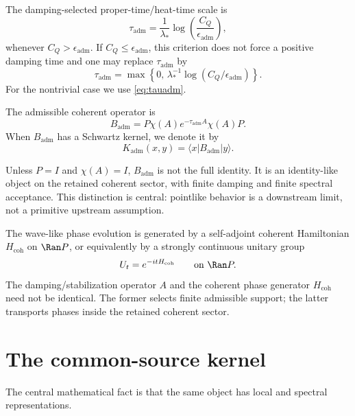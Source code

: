 \documentclass[11pt]{article}
\newcommand{\Kadm}{K_{\mathrm{adm}}}
\newcommand{\Badm}{B_{\mathrm{adm}}}
\newcommand{\ta}{\tau_{\mathrm{adm}}}
\newcommand{\epsadm}{\epsilon_{\mathrm{adm}}}
\newcommand{\coh}{\mathrm{coh}}
\begin{document}
The damping-selected proper-time/heat-time scale is
\begin{equation}
  \ta
  =
  \frac{1}{\lambda_\ast}
  \log\left(\frac{C_Q}{\epsadm}\right),
  \label{eq:tauadm}
\end{equation}
whenever \(C_Q>\epsadm\). If \(C_Q\le \epsadm\), this criterion does not force a positive
damping time and one may replace \(\ta\) by
\[
  \ta
  =
  \max\left\{
  0,\,
  \lambda_\ast^{-1}\log(C_Q/\epsadm)
  \right\}.
\]
For the nontrivial case we use \cref{eq:tauadm}.

\begin{definition}
The admissible coherent operator is
\[
  \Badm
  =
  P\chi(A)e^{-\ta A}\chi(A)P.
\]
When \(\Badm\) has a Schwartz kernel, we denote it by
\[
  \Kadm(x,y)=\langle x|\Badm|y\rangle.
\]
\end{definition}

\begin{remark}
Unless \(P=I\) and \(\chi(A)=I\), \(\Badm\) is not the full identity. It is an identity-like
object on the retained coherent sector, with finite damping and finite spectral acceptance.
This distinction is central: pointlike behavior is a downstream limit, not a primitive
upstream assumption.
\end{remark}


\begin{assumption}
The wave-like phase evolution is generated by a self-adjoint coherent Hamiltonian
\(H_{\coh}\) on \(\Ran P\), or equivalently by a strongly continuous unitary group
\[
  U_t=e^{-itH_{\coh}}
  \qquad\text{on }\Ran P.
\]
The damping/stabilization operator \(A\) and the coherent phase generator \(H_{\coh}\) need
not be identical. The former selects finite admissible support; the latter transports phases
inside the retained coherent sector.
\end{assumption}

\section{The common-source kernel}

The central mathematical fact is that the same object has local and spectral representations.
\end{document}
